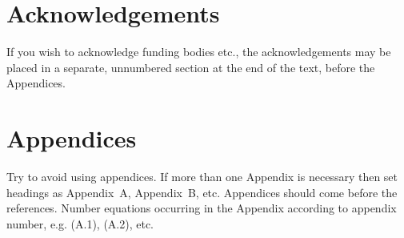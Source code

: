 \documentclass{evolang11}
\begin{document}
\section*{Acknowledgements}

If you wish to acknowledge funding bodies etc., the acknowledgements
may be placed in a separate, unnumbered section at the end of the
text, before the Appendices.

\appendix

\section{Appendices}

Try to avoid using appendices.  If more than one Appendix is necessary
then set headings as Appendix~A, Appendix~B, etc.  Appendices should
come before the references. Number equations occurring in the Appendix according to appendix number, e.g. (A.1), (A.2), etc.



\end{document}
